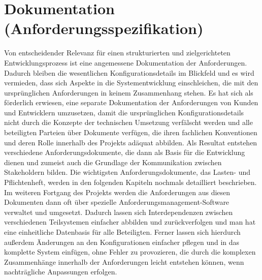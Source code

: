 \section{Dokumentation (Anforderungsspezifikation)}
Von entscheidender Relevanz für einen strukturierten und zielgerichteten Entwicklungsprozess ist eine angemessene Dokumentation der Anforderungen. Dadurch bleiben die wesentlichen Konfigurationsdetails im Blickfeld und es wird vermieden, dass sich Aspekte in die Systementwicklung einschleichen, die mit den ursprünglichen Anforderungen in keinem Zusammenhang stehen. 
Es hat sich als förderlich erwiesen, eine separate Dokumentation der Anforderungen von Kunden und Entwicklern umzusetzen, damit die ursprünglichen Konfigurationsdetails nicht durch die Konzepte der technischen Umsetzung verfälscht werden und alle beteiligten Parteien über Dokumente verfügen, 
die ihren fachlichen Konventionen und deren Rolle innerhalb des Projekts adäquat abbilden. Als Resultat entstehen 
verschiedene Anforderungsdokumente, die dann als Basis für die Entwicklung dienen und zumeist auch die Grundlage der Kommunikation zwischen Stakeholdern bilden. Die wichtigsten Anforderungsdokumente, das Lasten- und 
Pflichtenheft, werden in den folgenden Kapiteln nochmals detailliert beschrieben. 
Im weiteren Fortgang des Projekts werden die Anforderungen aus diesen Dokumenten dann oft über spezielle Anforderungsmanagement-Software verwaltet und umgesetzt. Dadurch lassen sich Interdependenzen zwischen verschiedenen Teilsystemen einfacher abbilden und zurückverfolgen und man hat eine einheitliche Datenbasis für alle Beteiligten. Ferner lassen sich hierdurch außerdem Änderungen an den Konfigurationen einfacher pflegen und in das komplette System einfügen, ohne Fehler zu provozieren, die durch die komplexen Zusammenhänge innerhalb der Anforderungen leicht entstehen können, wenn nachträgliche Anpassungen erfolgen.
\cite{fraunhofer-anforderung}

